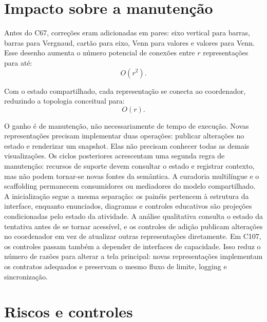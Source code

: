 \documentclass[12pt,a4paper]{article}
\begin{document}
\section{Impacto sobre a manutenção}

Antes do C67, correções eram adicionadas em pares: eixo vertical para barras, barras para Vergnaud, cartão para eixo, Venn para valores e valores para Venn. Esse desenho aumenta o número potencial de conexões entre $r$ representações para até:
\[
O(r^2).
\]

Com o estado compartilhado, cada representação se conecta ao coordenador, reduzindo a topologia conceitual para:
\[
O(r).
\]

O ganho é de manutenção, não necessariamente de tempo de execução. Novas representações precisam implementar duas operações: publicar alterações no estado e renderizar um snapshot. Elas não precisam conhecer todas as demais visualizações. Os ciclos posteriores acrescentam uma segunda regra de manutenção: recursos de suporte devem consultar o estado e registrar contexto, mas não podem tornar-se novas fontes da semântica. A curadoria multilíngue e o scaffolding permanecem consumidores ou mediadores do modelo compartilhado. A inicialização segue a mesma separação: os painéis pertencem à estrutura da interface, enquanto enunciados, diagramas e controles educativos são projeções condicionadas pelo estado da atividade. A análise qualitativa consulta o estado da tentativa antes de se tornar acessível, e os controles de adição publicam alterações no coordenador em vez de atualizar outras representações diretamente. Em C107, os controles passam também a depender de interfaces de capacidade. Isso reduz o número de razões para alterar a tela principal: novas representações implementam os contratos adequados e preservam o mesmo fluxo de limite, logging e sincronização.

\section{Riscos e controles}
\end{document}
